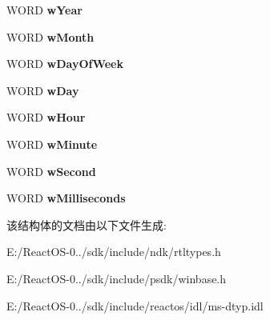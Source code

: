 \begin{DoxyCompactItemize}
W\+O\+RD {\bfseries w\+Year}
\item 
\mbox{\label{struct___s_y_s_t_e_m_t_i_m_e_a773fd89ec4a08997a0944cee8a3e41bf}} 
W\+O\+RD {\bfseries w\+Month}
\item 
\mbox{\label{struct___s_y_s_t_e_m_t_i_m_e_af3160b42a89d9ce648f97fc6d178743f}} 
W\+O\+RD {\bfseries w\+Day\+Of\+Week}
\item 
\mbox{\label{struct___s_y_s_t_e_m_t_i_m_e_aee7ad267ed9d9ed1581ddd4ad37b6055}} 
W\+O\+RD {\bfseries w\+Day}
\item 
\mbox{\label{struct___s_y_s_t_e_m_t_i_m_e_a8661dc983347452db670a2a92ffebb67}} 
W\+O\+RD {\bfseries w\+Hour}
\item 
\mbox{\label{struct___s_y_s_t_e_m_t_i_m_e_ab5eefa38099851abfd25436491d2b639}} 
W\+O\+RD {\bfseries w\+Minute}
\item 
\mbox{\label{struct___s_y_s_t_e_m_t_i_m_e_a8c9567e77fcdc10d9a1f7d687c8c5f7d}} 
W\+O\+RD {\bfseries w\+Second}
\item 
\mbox{\label{struct___s_y_s_t_e_m_t_i_m_e_a3204cab99283c838ccd126efeef30976}} 
W\+O\+RD {\bfseries w\+Milliseconds}
\end{DoxyCompactItemize}


该结构体的文档由以下文件生成\+:\begin{DoxyCompactItemize}
\item 
E\+:/\+React\+O\+S-\/0../sdk/include/ndk/rtltypes.\+h\item 
E\+:/\+React\+O\+S-\/0../sdk/include/psdk/winbase.\+h\item 
E\+:/\+React\+O\+S-\/0../sdk/include/reactos/idl/ms-\/dtyp.\+idl\end{DoxyCompactItemize}
